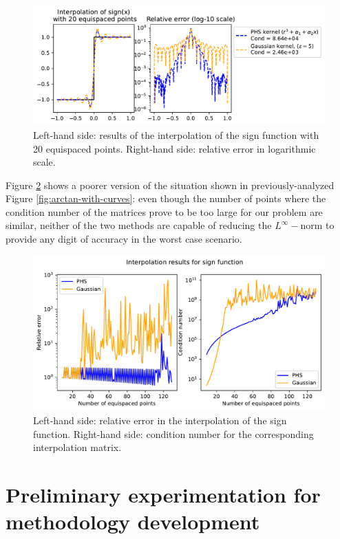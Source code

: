 \documentclass[12pt]{report} %
\begin{document}
\begin{figure}[ht]
  \centering
  \includegraphics[width=\textwidth]{imagenes/experiments/1d/intro/sign-with-20-pts.pdf}
  \caption{Left-hand side: results of the interpolation of the sign function with 20 equispaced points. Right-hand side: relative error in logarithmic scale.}
  \label{fig:sign-with-20-pts}
\end{figure}

Figure \ref{fig:sign-with-curves} shows a poorer version of the situation shown in previously-analyzed Figure \ref{fig:arctan-with-curves}: even though the number of points where the condition number of the matrices prove to be too large for our problem are similar, neither of the two methods are capable of reducing the $L^\infty-$norm to provide any digit of accuracy in the worst case scenario.

\begin{figure}[ht]
  \centering
  \includegraphics[width=.8\textwidth]{imagenes/experiments/1d/intro/sign-interpolation-curves.pdf}
  \caption{Left-hand side: relative error in the interpolation of the sign function. Right-hand side: condition number for the corresponding interpolation matrix.}
  \label{fig:sign-with-curves}
\end{figure}



\chapter{Preliminary experimentation for methodology development}
\end{document}
